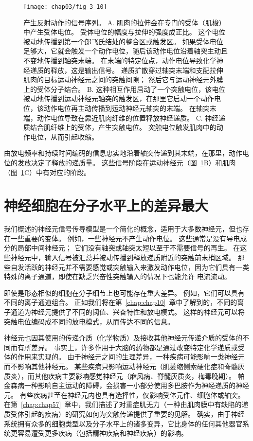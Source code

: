 \begin{figure}[htbp]
	\centering
	\texttt{[image: chap03/fig\_3\_10]}
	\caption{产生反射动作的信号序列。
		A. 肌肉的拉伸会在专门的受体（肌梭）中产生受体电位。 
		受体电位的幅度与拉伸的强度成正比。 
		这个电位被动地传播到第一个郎飞氏结处的整合区或触发区。
		如果受体电位足够大，它就会触发一个动作电位，随后该动作电位沿着轴突主动且不变地传播到轴突末端。
		在末端的特定位点，动作电位导致化学神经递质的释放，这是输出信号。
		递质扩散穿过轴突末端和支配拉伸肌肉的目标运动神经元之间的突触间隙；
		然后它与运动神经元外膜上的受体分子结合。
		B. 这种相互作用启动了一个突触电位，该电位被动地传播到运动神经元轴突的触发区，在那里它启动一个动作电位，该动作电位再主动传播到运动神经元轴突的末端。
		在轴突末端，动作电位导致在靠近肌肉纤维的位置释放神经递质。
		C. 神经递质结合肌纤维上的受体，产生突触电位。
		突触电位触发肌肉中的动作电位，从而引起收缩。}
	\label{fig:3_10}
\end{figure}


由放电频率和持续时间编码的信息忠实地沿着轴突传递到其末端，在那里，动作电位的发放决定了释放的递质量。 
这些信号阶段在运动神经元（图~\ref{fig:3_10}B）和肌肉（图~\ref{fig:3_10}C）中有对应的阶段。


\section{神经细胞在分子水平上的差异最大}
我们概述的神经元信号传导模型是一个简化的概念，适用于大多数神经元，但也存在一些重要的变体。
例如，一些神经元不产生动作电位。 
这些通常是没有导电成分的局部中间神经元； 它们没有轴突或轴突太短以至于不需要信号的再生。 
在这些神经元中，输入信号被汇总并被动传播到释放递质附近的突触前末梢区域。 
那些自发活跃的神经元并不需要感觉或突触输入来激发动作电位，因为它们具有一类特殊的离子通道，即使在缺乏兴奋性突触输入的情况下也能允许  电流流动。


即使是形态相似的细胞在分子细节上也可能存在重大差异。
例如，它们可以具有不同的离子通道组合。
正如我们将在第~\ref{chap:chap10}~章中了解到的，不同的离子通道为神经元提供了不同的阈值、兴奋特性和放电模式。
这样的神经元可以将突触电位编码成不同的放电模式，从而传达不同的信息。


神经元也因其使用的传递介质（化学物质）及接收其他神经元传递介质的受体的不同而有所差异。
事实上，许多作用于大脑的药物都是通过改变特定化学递质或受体的作用来实现的。 
由于神经元之间的生理差异，一种疾病可能影响一类神经元而不影响其他神经元。 
某些疾病只影响运动神经元（肌萎缩侧索硬化症和脊髓灰质炎），而其他疾病主要影响感觉神经元（麻风病、脊髓灰质炎，梅毒晚期）。
帕金森病一种影响自主运动的障碍，会损害一小部分使用多巴胺作为神经递质的神经元。 
有些疾病甚至在神经元内也具有选择性，仅影响受体元件、细胞体或轴突。
在第~\ref{chap:chap57}~章中，我们描述了对重症肌无力（一种由肌肉膜中有缺陷的递质受体引起的疾病）的研究如何为突触传递提供了重要的见解。
确实，由于神经系统拥有众多的细胞类型以及分子水平上的诸多变异，它比身体的任何其他器官系统更容易遭受更多疾病（包括精神疾病和神经疾病）的影响。


